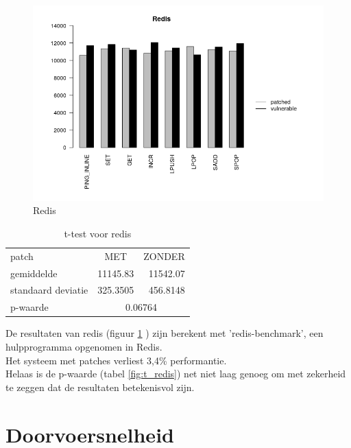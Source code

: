 \begin{figure}
	\includegraphics[width=1.0\linewidth]{img/redis.png}
	\caption{Redis}
	\label{fig:redis}
\end{figure}

\begin{table}[]
	\centering
	\caption{t-test voor redis}
	\label{t_redis}
	\begin{tabular}{l|cr}
		\hline
		patch              & MET                          & \multicolumn{1}{c}{ZONDER} \\
		gemiddelde         & \multicolumn{1}{r}{11145.83} & 11542.07                   \\
		standaard deviatie & \multicolumn{1}{r}{325.3505} & 456.8148                   \\ \hline
		p-waarde           & \multicolumn{2}{c|}{0.06764}                             
	\end{tabular}
\end{table}


De resultaten van redis (figuur \ref{fig:redis} ) zijn berekent met 'redis-benchmark', een hulpprogramma opgenomen in Redis.\\

Het systeem met patches verliest 3,4\% performantie.\\
Helaas is de p-waarde (tabel \ref{fig:t_redis}) net niet laag genoeg om met zekerheid te zeggen dat de resultaten betekenisvol zijn.




\section{Doorvoersnelheid}

